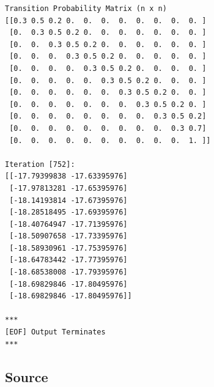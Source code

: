 \documentclass{article}
\begin{document}
\begin{lstlisting}
Transition Probability Matrix (n x n)
[[0.3 0.5 0.2 0.  0.  0.  0.  0.  0.  0.  0. ]
 [0.  0.3 0.5 0.2 0.  0.  0.  0.  0.  0.  0. ]
 [0.  0.  0.3 0.5 0.2 0.  0.  0.  0.  0.  0. ]
 [0.  0.  0.  0.3 0.5 0.2 0.  0.  0.  0.  0. ]
 [0.  0.  0.  0.  0.3 0.5 0.2 0.  0.  0.  0. ]
 [0.  0.  0.  0.  0.  0.3 0.5 0.2 0.  0.  0. ]
 [0.  0.  0.  0.  0.  0.  0.3 0.5 0.2 0.  0. ]
 [0.  0.  0.  0.  0.  0.  0.  0.3 0.5 0.2 0. ]
 [0.  0.  0.  0.  0.  0.  0.  0.  0.3 0.5 0.2]
 [0.  0.  0.  0.  0.  0.  0.  0.  0.  0.3 0.7]
 [0.  0.  0.  0.  0.  0.  0.  0.  0.  0.  1. ]]

Iteration [752]:
[[-17.79399838 -17.63395976]
 [-17.97813281 -17.65395976]
 [-18.14193814 -17.67395976]
 [-18.28518495 -17.69395976]
 [-18.40764947 -17.71395976]
 [-18.50907658 -17.73395976]
 [-18.58930961 -17.75395976]
 [-18.64783442 -17.77395976]
 [-18.68538008 -17.79395976]
 [-18.69829846 -17.80495976]
 [-18.69829846 -17.80495976]]

***
[EOF] Output Terminates
***
\end{lstlisting}

\subsection{Source}


\end{document}
